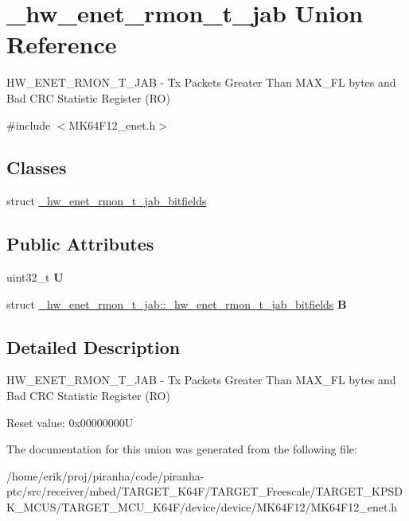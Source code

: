 \hypertarget{union__hw__enet__rmon__t__jab}{}\section{\+\_\+hw\+\_\+enet\+\_\+rmon\+\_\+t\+\_\+jab Union Reference}
\label{union__hw__enet__rmon__t__jab}


H\+W\+\_\+\+E\+N\+E\+T\+\_\+\+R\+M\+O\+N\+\_\+\+T\+\_\+\+J\+AB -\/ Tx Packets Greater Than M\+A\+X\+\_\+\+FL bytes and Bad C\+RC Statistic Register (RO)  




{\ttfamily \#include $<$M\+K64\+F12\+\_\+enet.\+h$>$}

\subsection*{Classes}
\begin{DoxyCompactItemize}
\item 
struct \hyperlink{struct__hw__enet__rmon__t__jab_1_1__hw__enet__rmon__t__jab__bitfields}{\+\_\+hw\+\_\+enet\+\_\+rmon\+\_\+t\+\_\+jab\+\_\+bitfields}
\end{DoxyCompactItemize}
\subsection*{Public Attributes}
\begin{DoxyCompactItemize}
\item 
uint32\+\_\+t {\bfseries U}\hypertarget{union__hw__enet__rmon__t__jab_a9354fbcbfd48340b1280a9520424d7a9}{}\label{union__hw__enet__rmon__t__jab_a9354fbcbfd48340b1280a9520424d7a9}

\item 
struct \hyperlink{struct__hw__enet__rmon__t__jab_1_1__hw__enet__rmon__t__jab__bitfields}{\+\_\+hw\+\_\+enet\+\_\+rmon\+\_\+t\+\_\+jab\+::\+\_\+hw\+\_\+enet\+\_\+rmon\+\_\+t\+\_\+jab\+\_\+bitfields} {\bfseries B}\hypertarget{union__hw__enet__rmon__t__jab_aa9ab71baf08c2c38727db4ee3bc2cdc1}{}\label{union__hw__enet__rmon__t__jab_aa9ab71baf08c2c38727db4ee3bc2cdc1}

\end{DoxyCompactItemize}


\subsection{Detailed Description}
H\+W\+\_\+\+E\+N\+E\+T\+\_\+\+R\+M\+O\+N\+\_\+\+T\+\_\+\+J\+AB -\/ Tx Packets Greater Than M\+A\+X\+\_\+\+FL bytes and Bad C\+RC Statistic Register (RO) 

Reset value\+: 0x00000000U 

The documentation for this union was generated from the following file\+:\begin{DoxyCompactItemize}
\item 
/home/erik/proj/piranha/code/piranha-\/ptc/src/receiver/mbed/\+T\+A\+R\+G\+E\+T\+\_\+\+K64\+F/\+T\+A\+R\+G\+E\+T\+\_\+\+Freescale/\+T\+A\+R\+G\+E\+T\+\_\+\+K\+P\+S\+D\+K\+\_\+\+M\+C\+U\+S/\+T\+A\+R\+G\+E\+T\+\_\+\+M\+C\+U\+\_\+\+K64\+F/device/device/\+M\+K64\+F12/M\+K64\+F12\+\_\+enet.\+h\end{DoxyCompactItemize}
